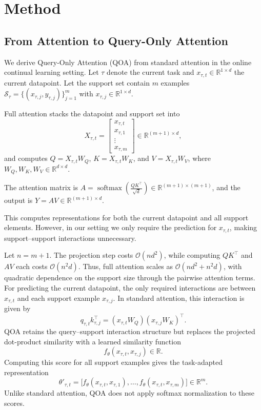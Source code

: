 \documentclass{article}
\begin{document}
\section{Method}
\subsection{From Attention to Query-Only Attention}
\label{sec:attention_to_qoa}

We derive Query-Only Attention (QOA) from standard attention in the online continual learning setting. Let $\tau$ denote the current task and $x_{\tau,t}\in\mathbb{R}^{1\times d}$ the current datapoint. Let the support set contain $m$ examples $\mathcal{S}_{\tau}=\{(x_{\tau,j},y_{\tau,j})\}_{j=1}^{m}$ with $x_{\tau,j}\in\mathbb{R}^{1\times d}$.

Full attention stacks the datapoint and support set into
\[
X_{\tau,t}=
\begin{bmatrix}
x_{\tau,t} \\
x_{\tau,1} \\
\vdots \\
x_{\tau,m}
\end{bmatrix}
\in\mathbb{R}^{(m+1)\times d},
\]
and computes $Q=X_{\tau,t}W_Q$, $K=X_{\tau,t}W_K$, and $V=X_{\tau,t}W_V$, where $W_Q,W_K,W_V\in\mathbb{R}^{d\times d}$.

The attention matrix is $A=\operatorname{softmax}\!\left(\frac{QK^\top}{\sqrt{d}}\right)\in\mathbb{R}^{(m+1)\times(m+1)}$, and the output is $Y=AV\in\mathbb{R}^{(m+1)\times d}$.

This computes representations for both the current datapoint and all support elements. However, in our setting we only require the prediction for $x_{\tau,t}$, making support--support interactions unnecessary.

Let $n=m+1$. The projection step costs $\mathcal{O}(nd^2)$, while computing $QK^\top$ and $AV$ each costs $\mathcal{O}(n^2 d)$. Thus, full attention scales as $\mathcal{O}(nd^2 + n^2 d)$, with quadratic dependence on the support size through the pairwise attention terms. For predicting the current datapoint, the only required interactions are between $x_{\tau,t}$ and each support example $x_{\tau,j}$. In standard attention, this interaction is given by
\[
q_{\tau,t}k_{\tau,j}^{\top}
=
(x_{\tau,t}W_Q)(x_{\tau,j}W_K)^\top .
\]
QOA retains the query--support interaction structure but replaces the projected dot-product similarity with a learned similarity function
\[
f_\theta(x_{\tau,t},x_{\tau,j})\in\mathbb{R}.
\]
Computing this score for all support examples gives the task-adapted representation
\[
\theta'_{\tau,t}
=
\big[
f_\theta(x_{\tau,t},x_{\tau,1}),
\ldots,
f_\theta(x_{\tau,t},x_{\tau,m})
\big]
\in\mathbb{R}^{m}.
\]
Unlike standard attention, QOA does not apply softmax normalization to these scores.
\end{document}
